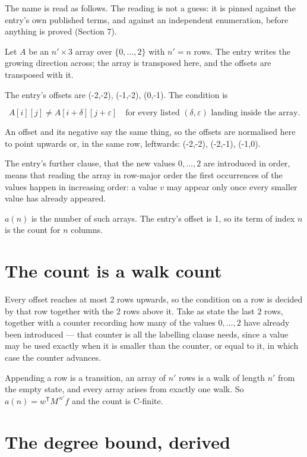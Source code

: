 \documentclass[11pt]{article}
\theoremstyle{definition}
\begin{document}
The name is read as follows. The reading is not a guess: it is pinned against the entry's own published terms, and against an independent enumeration, before anything is proved (Section 7).

Let $A$ be an $n' \times 3$ array over $\{0,\dots,2\}$ with $n' = n$ rows. The entry writes the growing direction across; the array is transposed here, and the offsets are transposed with it.

The entry's offsets are (-2,-2), (-1,-2), (0,-1). The condition is

\[A[i][j] \ne A[i{+}\delta][j{+}\varepsilon]\quad\text{for every listed }(\delta,\varepsilon)\text{ landing inside the array.}\]

An offset and its negative say the same thing, so the offsets are normalised here to point upwards or, in the same row, leftwards: (-2,-2), (-2,-1), (-1,0).

The entry's further clause, that the new values $0,\dots,2$ are introduced in order, means that reading the array in row-major order the first occurrences of the values happen in increasing order: a value $v$ may appear only once every smaller value has already appeared.

$a(n)$ is the number of such arrays. The entry's offset is 1, so its term of index $n$ is the count for $n$ columns.

\section{The count is a walk count}

Every offset reaches at most $2$ rows upwards, so the condition on a row is decided by that row together with the $2$ rows above it. Take as state the last $2$ rows, together with a counter recording how many of the values $0,\dots,2$ have already been introduced --- that counter is all the labelling clause needs, since a value may be used exactly when it is smaller than the counter, or equal to it, in which case the counter advances.

Appending a row is a transition, an array of $n'$ rows is a walk of length $n'$ from the empty state, and every array arises from exactly one walk. So $a(n) = w^{\mathsf T}M^{\,n'}f$ and the count is C-finite.

\section{The degree bound, derived}
\end{document}
